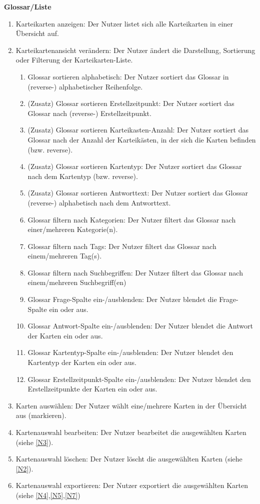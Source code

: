 \documentclass[fontsize=12pt,paper=a4,twoside]{scrartcl}
\begin{document}
\textbf{Glossar/Liste}
\begin{enumerate}[resume, label={N\arabic*}]
	\item Karteikarten anzeigen: Der Nutzer listet sich alle Karteikarten in einer Übersicht auf.
	\item Karteikartenansicht verändern: Der Nutzer ändert die Darstellung, Sortierung oder Filterung der Karteikarten-Liste.
	\begin{enumerate}[label*=-\arabic*]
		\item Glossar sortieren alphabetisch: Der Nutzer sortiert das Glossar in (reverse-) alphabetischer Reihenfolge.
		\item (Zusatz) Glossar sortieren Erstellzeitpunkt: Der Nutzer sortiert das Glossar nach (reverse-) Erstellzeitpunkt.
		\item (Zusatz) Glossar sortieren Karteikasten-Anzahl: Der Nutzer sortiert das Glossar nach der Anzahl der Karteikästen, in der sich die Karten befinden (bzw. reverse).
		\item (Zusatz) Glossar sortieren Kartentyp: Der Nutzer sortiert das Glossar nach dem Kartentyp (bzw. reverse).
		\item (Zusatz) Glossar sortieren Antworttext: Der Nutzer sortiert das Glossar (reverse-) alphabetisch nach dem Antworttext.
		\item Glossar filtern nach Kategorien: Der Nutzer filtert das Glossar nach einer/mehreren Kategorie(n).
		\item Glossar filtern nach Tags: Der Nutzer filtert das Glossar nach einem/mehreren Tag(s).
		\item Glossar filtern nach Suchbegriffen: Der Nutzer filtert das Glossar nach einem/mehreren Suchbegriff(en)
		\item Glossar Frage-Spalte ein-/ausblenden: Der Nutzer blendet die Frage-Spalte ein oder aus. %
		\item Glossar Antwort-Spalte ein-/ausblenden: Der Nutzer blendet die Antwort der Karten ein oder aus.
		\item Glossar Kartentyp-Spalte ein-/ausblenden: Der Nutzer blendet den Kartentyp der Karten ein oder aus.
		\item Glossar Erstellzeitpunkt-Spalte ein-/ausblenden: Der Nutzer blendet den Erstellzeitpunkte der Karten ein oder aus.
	\end{enumerate}
	\item Karten auswählen: Der Nutzer wählt eine/mehrere Karten in der Übersicht aus (markieren).
	\item Kartenauswahl bearbeiten: Der Nutzer bearbeitet die ausgewählten Karten (siehe \ref{N3}).
	\item Kartenauswahl löschen: Der Nutzer löscht die ausgewählten Karten (siehe \ref{N2}).
	\item Kartenauswahl exportieren: Der Nutzer exportiert die ausgewählten Karten (siehe \ref{N4},\ref{N5},\ref{N7})

\end{enumerate}
\end{document}
